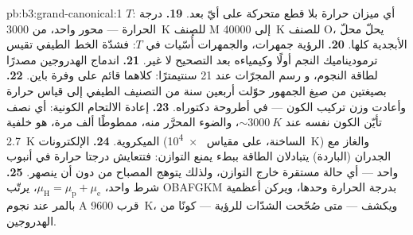 \begin{solution}{pb:b3:grand-canonical:1}
$T$: أي ميزان حرارة بلا قطع متحركة على أيّ بعد.
\textbf{19.} درجة الحرارة --- محور واحد، من \qty{3000}{K} للصنف M إلى
\qty{40000}{K} للصنف O، يحلّ محلّ الأبجدية كلها.
\textbf{20.} الرؤية جمهرات، والجمهرات أُسّيات
في $T$: فشدّة الخط الطيفي تقيس
ترموديناميك النجم أولًا وكيمياءه بعد
التصحيح لا غير.
\textbf{21.} اندماج الهدروجين مصدرًا لطاقة النجوم، و
رسم المجرّات عند 21 سنتيمترًا: كلاهما قائم على وفرة
باين.
\textbf{22.} بصيغتين من صيغ الجمهور حوّلت أربعين سنة
من التصنيف الطيفي إلى قياس حرارة وأعادت وزن
تركيب الكون --- في أطروحة دكتوراه.
\textbf{23.} إعادة الالتحام الكونية: أي نصف تأيّن الكون
نفسه عند $\sim\qty{3000}{K}$، والضوء المحرَّر منه،
ممطوطًا ألف مرة، هو خلفية \qty{2.7}{K}
الميكروية.
\textbf{24.} الإلكترونات (الساخنة، على مقياس \qty{e4}{K}) والغاز
مع الجدران (الباردة) يتبادلان الطاقة ببطء يمنع التوازن: فتتعايش
درجتا حرارة في أنبوب واحد --- أي حالة مستقرة خارج
التوازن، ولذلك يتوهج المصباح من دون أن ينصهر.
\textbf{25.} شرط واحد، $\mu_{\text{H}} = \mu_{\text{p}} +
\mu_{\text{e}}$، يرتّب OBAFGKM بدرجة الحرارة وحدها، ويركن
أعظمية بالمر عند نجوم A قرب \qty{9600}{K}، ويكشف --- متى
صُحّحت الشدّات للرؤية --- كونًا من
الهدروجين.
\end{solution}
